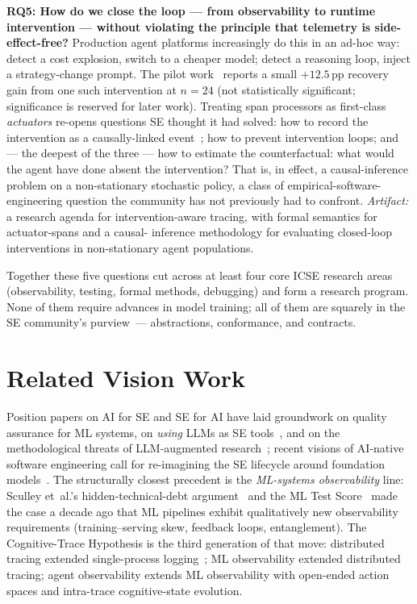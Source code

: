 \documentclass[10pt,conference]{IEEEtran}
\begin{document}
\textbf{RQ5: How do we close the loop --- from observability to runtime
intervention --- without violating the principle that telemetry is
side-effect-free?}
Production agent platforms increasingly do this in an ad-hoc way:
detect a cost explosion, switch to a cheaper model; detect a
reasoning loop, inject a strategy-change prompt. The pilot
work~\cite{anon_taxonomy_2026} reports a small $+12.5$\,pp recovery
gain from one such intervention at $n{=}24$ (not statistically
significant; significance is reserved for later work). Treating
span processors as first-class \emph{actuators} re-opens questions
SE thought it had solved: how to record the intervention as a
causally-linked event~\cite{xtrace}; how to prevent intervention
loops; and --- the deepest of the three --- how to estimate the
counterfactual: what would the agent have done absent the
intervention? That is, in effect, a causal-inference problem on a
non-stationary stochastic policy, a class of empirical-software-
engineering question the community has not previously had to
confront. \emph{Artifact:} a research agenda for intervention-aware
tracing, with formal semantics for actuator-spans and a causal-
inference methodology for evaluating closed-loop interventions in
non-stationary agent populations.

Together these five questions cut across at least four core ICSE
research areas (observability, testing, formal methods, debugging)
and form a research program. None of them require advances in model
training; all of them are squarely in the SE community's
purview~--- abstractions, conformance, and contracts.

\section{Related Vision Work}
\label{sec:related}

Position papers on AI for SE and SE for AI have laid groundwork on
quality assurance for ML systems, on \emph{using} LLMs as SE
tools~\cite{lo_se_in_age_of_ai}, and on the methodological threats of
LLM-augmented research~\cite{nguyen_breaking_silence}; recent
visions of AI-native software engineering call for re-imagining the SE
lifecycle around foundation models~\cite{hassan_software_30}. The
structurally closest precedent is the \emph{ML-systems observability}
line: Sculley et~al.'s hidden-technical-debt
argument~\cite{sculley_tech_debt} and the ML Test
Score~\cite{breck_ml_test_score} made the case a decade ago that ML
pipelines exhibit qualitatively new observability requirements
(training--serving skew, feedback loops, entanglement). The
Cognitive-Trace Hypothesis is the third generation of that move:
distributed tracing extended single-process
logging~\cite{dapper,tracing_practice}; ML observability extended
distributed tracing; agent observability extends ML observability with
open-ended action spaces and intra-trace cognitive-state evolution.
\end{document}
